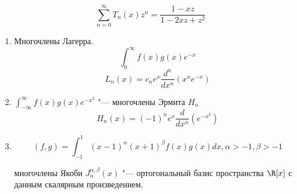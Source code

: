 \begin{enumerate}
$$\sum_{n = 0}^{\infty} T_n(x)z^n = \frac{1 - xz}{1 - 2xz + z^2} $$
\begin{exmp}
\begin{enumerate}
\item
Многочлены Лагерра. 
$$\int_{0}^{\infty}f(x)g(x)e^{-x}$$
$$L_n(x) = c_ne^x \frac{d^n}{dx^n}(x^ne^{-x}) $$
\item 
$\int_{- \infty}^{\infty}f(x)g(x)e^{-x^2}$  "--- многочлены Эрмита $H_n$
$$H_n(x) = (-1)^ne^x\frac{d}{dx^n}(e^{-x^2})$$
\item 
$$(f, g) = \int_{-1}^{1}(x - 1)^{\alpha}(x + 1)^{\beta}f(x)g(x)dx, \alpha > -1, \beta > -1$$

многочлены Якоби $J_n^{\alpha, \beta}(x)$ "--- ортогональный базис пространства $\R[x]$ с данным скалярным произведением. 
\end{enumerate}
\end{exmp}
\end{enumerate}
